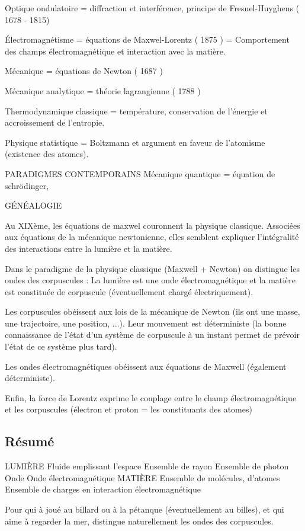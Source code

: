 	Optique ondulatoire = diffraction et interférence, principe de Fresnel-Huyghens ( 1678 - 1815)

	Électromagnétisme =  équations de Maxwel-Lorentz ( 1875 ) = Comportement des champs électromagnétique et interaction avec la matière.

	Mécanique = équations de Newton ( 1687 )

	Mécanique analytique = théorie lagrangienne ( 1788 )

	Thermodynamique classique = température, conservation de l'énergie et accroissement de l'entropie.

	Physique statistique = Boltzmann et argument en faveur de l'atomisme (existence des atomes).


PARADIGMES CONTEMPORAINS
	Mécanique quantique = équation de schrödinger, 

GÉNÉALOGIE

Au XIXème, les équations de maxwel couronnent la physique classique. Associées aux équations de la mécanique newtonienne, elles semblent expliquer l'intégralité des interactions entre la lumière et la matière.

Dans le paradigme de la physique classique (Maxwell + Newton) on distingue les ondes des corpuscules : La lumière est une onde électromagnétique et la matière est constituée de corpuscule (éventuellement chargé électriquement).

Les corpuscules obéissent aux lois de la mécanique de Newton (ils ont une masse, une trajectoire, une position, ...). Leur mouvement est déterministe (la bonne connaissance de l'état d'un système de corpuscule à un instant permet de prévoir l'état de ce système plus tard).

Les ondes électromagnétiques obéissent aux équations de Maxwell (également déterministe).

Enfin, la force de Lorentz exprime le couplage entre le champ électromagnétique et les corpuscules (électron et proton = les constituants des atomes)




\subsection{Résumé}

LUMIÈRE
	Fluide emplissant l'espace
	Ensemble de rayon
	Ensemble de photon
	Onde
	Onde électromagnétique
MATIÈRE
	Ensemble de molécules, d'atomes
	Ensemble de charges en interaction électromagnétique
	

Pour qui à joué au billard ou à la pétanque (éventuellement au billes), et qui aime à regarder la mer, distingue naturellement les ondes des corpuscules.


\subsection{}
\begin{center}
\end{center}

